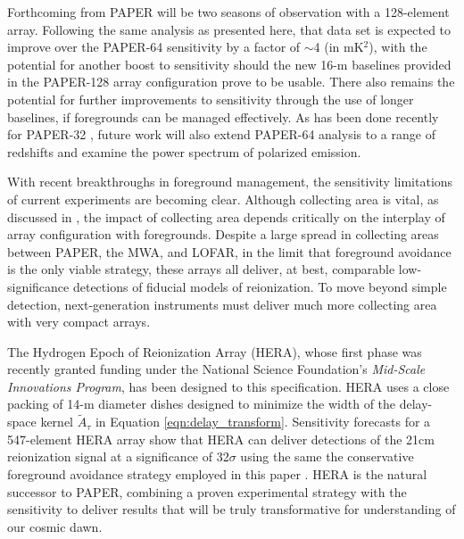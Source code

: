 \documentclass[twocolumn,numberedappendix]{emulateapj} \shorttitle{PSA64}
\begin{document}
Forthcoming from PAPER will be two seasons of observation with a 128-element array.
Following the same analysis as presented here, that data set is expected to improve 
over the PAPER-64 sensitivity by a factor of $\sim$4 (in mK$^2$), with the potential for another boost to sensitivity
should the new 16-m baselines provided in the PAPER-128 array configuration prove to be
usable.  There also remains the potential for further improvements to sensitivity through the
use of longer baselines, if foregrounds can be managed effectively.
As has been done recently for PAPER-32 \citep{jacobs_et_al2014,moore_et_al2015}, 
future work will also extend PAPER-64 analysis
to a range of redshifts and examine the power spectrum of polarized emission.



With recent breakthroughs in foreground management, the sensitivity 
limitations of current experiments are becoming clear.  Although collecting area is vital,
as discussed in \citet{pober_et_al2014}, the impact of collecting area
depends critically on the interplay of array configuration with foregrounds.
Despite a large spread in collecting areas between PAPER, the MWA, and LOFAR,
in the limit that foreground avoidance is the only viable strategy, these
arrays all deliver, at best, comparable low-significance detections of fiducial models
of reionization.  To move beyond simple detection, next-generation instruments must
deliver much more collecting area with very compact arrays.

The Hydrogen Epoch of Reionization Array (HERA), whose first phase was recently granted funding
under the National Science Foundation's {\it Mid-Scale Innovations Program}, has been
designed to this specification. HERA uses a close packing of 14-m diameter 
dishes designed to minimize the width of the delay-space kernel
$\tilde{A}_\tau$ in Equation \eqref{eqn:delay_transform}.
Sensitivity forecasts for a 547-element HERA array
show that HERA can deliver detections of the 21cm reionization signal
at a significance of 32$\sigma$ using the same the conservative 
foreground avoidance strategy employed in this paper
\citet{pober_et_al2014}.  HERA is the natural successor
to PAPER, combining a proven experimental strategy with the 
sensitivity to deliver results that will be truly transformative for
understanding of our cosmic dawn.
\end{document}
